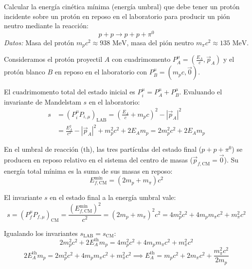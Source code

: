 \begin{problema}
Calcular la energía cinética mínima (energía umbral) que debe tener un protón incidente sobre un protón en reposo en el laboratorio para producir un pión neutro mediante la reacción:
\begin{equation*}
p + p \longrightarrow p + p + \pi^0
\end{equation*}
\textit{Datos:} Masa del protón $m_p c^2 \approx 938\text{ MeV}$, masa del pión neutro $m_\pi c^2 \approx 135\text{ MeV}$.

\tcblower
Consideramos el protón proyectil $A$ con cuadrimomento $P_A^\mu = \left( \frac{E_A}{c}, \vec{p}_A \right)$ y el protón blanco $B$ en reposo en el laboratorio con $P_B^\mu = \left( m_p c, \vec{0} \right)$.

El cuadrimomento total del estado inicial es $P_i^\mu = P_A^\mu + P_B^\mu$. Evaluando el invariante de Mandelstam $s$ en el laboratorio:
\begin{align*}
s &= (P_i^\mu P_{i,\mu})_{\text{LAB}} = \left( \frac{E_A}{c} + m_p c \right)^2 - |\vec{p}_A|^2 \\
  &= \frac{E_A^2}{c^2} - |\vec{p}_A|^2 + m_p^2 c^2 + 2 E_A m_p = 2 m_p^2 c^2 + 2 E_A m_p
\end{align*}

En el umbral de reacción ($\text{th}$), las tres partículas del estado final ($p + p + \pi^0$) se producen en reposo relativo en el sistema del centro de masas ($\vec{p}_{f,\text{CM}} = \vec{0}$). Su energía total mínima es la suma de sus masas en reposo:
\begin{equation*}
E_{f,\text{CM}}^{\text{mín}} = (2 m_p + m_\pi) c^2
\end{equation*}

El invariante $s$ en el estado final a la energía umbral vale:
\begin{equation*}
s = (P_f^\mu P_{f,\mu})_{\text{CM}} = \frac{\left(E_{f,\text{CM}}^{\text{mín}}\right)^2}{c^2} = (2 m_p + m_\pi)^2 c^2 = 4 m_p^2 c^2 + 4 m_p m_\pi c^2 + m_\pi^2 c^2
\end{equation*}

Igualando los invariantes $s_{\text{LAB}} = s_{\text{CM}}$:
\begin{equation*}
2 m_p^2 c^2 + 2 E_A^{\text{th}} m_p = 4 m_p^2 c^2 + 4 m_p m_\pi c^2 + m_\pi^2 c^2
\end{equation*}
\begin{equation*}
2 E_A^{\text{th}} m_p = 2 m_p^2 c^2 + 4 m_p m_\pi c^2 + m_\pi^2 c^2 \implies E_A^{\text{th}} = m_p c^2 + 2 m_\pi c^2 + \frac{m_\pi^2 c^2}{2 m_p}
\end{equation*}


\end{problema}
